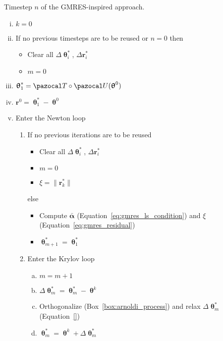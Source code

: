 \begin{framedbox}[htbp]
  \caption{Timestep \(n\) of the GMRES-inspired approach.}
  \label{box:gmres_inspired}
  \begin{center}
    \begin{minipage}{0.9\textwidth}
    \begin{enumerate}[(i)]
    \item \(k=0\)
    \item If no previous timesteps are to be reused or \(n=0\) then
    \begin{itemize}
      \item Clear all \(\Delta \bm \uptheta^*_i\), \(\Delta \mathbf r^*_i\)
      \item \(m=0\)
    \end{itemize}
    \item \(\bm \uptheta^*_1 = \pazocal T\circ \pazocal U(\bm \uptheta^0)\)
    \item \(\mathbf r^0 = \bm \uptheta^*_1 - \bm \uptheta^0\)
    \item Enter the Newton loop
    \begin{enumerate}[(1)]
      \item If no previous iterations are to be reused
      \begin{itemize}
        \item Clear all \(\Delta \bm\uptheta^*_i\), \(\Delta \mathbf r^*_i\)
        \item \(m=0\)
        \item \(\xi = \|\mathbf r^*_k\|\)
      \end{itemize}
      else
      \begin{itemize}
        \item Compute \(\bar{\mathbf\alpha}\) (Equation~\eqref{eq:gmres_ls_condition}) and \(\xi\) (Equation~\eqref{eq:gmres_residual})
        \item \(\bm \uptheta^*_{m+1} = \bm \uptheta^*_1\)
      \end{itemize}
      \item Enter the Krylov loop
      \begin{enumerate}[(a)]
        \item \(m=m+1\)
        \item \(\Delta \bm\uptheta^*_m = \bm\uptheta^*_m - \bm\uptheta^k\)
        \item Orthogonalize (Box~\ref{box:arnoldi_process}) and relax \(\Delta \bm\uptheta^*_m\) (Equation~\eqref{})
        \item \(\bm\uptheta^*_m = \bm\uptheta^k + \Delta\bm\uptheta^*_m\)

\end{enumerate}
\end{enumerate}
\end{enumerate}
\end{minipage}
\end{center}
\end{framedbox}
